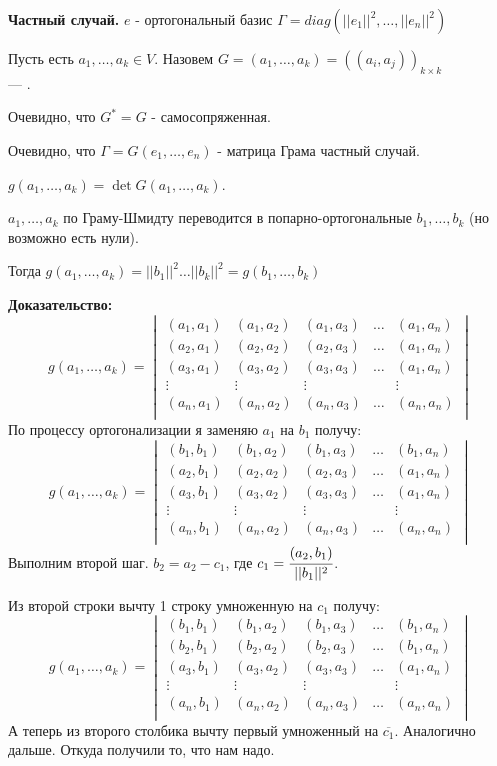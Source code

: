 \textbf{Частный случай.} $e$ - ортогональный базис $\Gamma = diag(||e_1||^2,\ldots,||e_n||^2)$

 Пусть есть $a_1,\ldots, a_k\in V$. Назовем $G = (a_1,\ldots,a_k) =((a_i,a_j))_{k\times k}$ \\--- .

Очевидно, что $G^* = G$ - самосопряженная.

Очевидно, что $\Gamma = G(e_1,\ldots, e_n)$ - матрица Грама частный случай.

 $g(a_1,\ldots, a_k) = \det G(a_1,\ldots, a_k)$.


$a_1,\ldots, a_k$ по Граму-Шмидту переводится в попарно-ортогональные $b_1,\ldots,b_k$ (но возможно есть нули).

Тогда $g(a_1,\ldots, a_k) = ||b_1||^2\ldots ||b_k||^2 = g(b_1,\ldots,b_k)$

\textbf{Доказательство:}
$$g(a_1,\ldots, a_k) = \begin{vmatrix}
    (a_1,a_1) & (a_1, a_2) & (a_1,a_3) & \ldots & (a_1,a_n)\\
     (a_2,a_1) & (a_2, a_2) & (a_2,a_3) & \ldots & (a_1,a_n)\\
      (a_3,a_1) & (a_3, a_2) & (a_3,a_3) & \ldots & (a_1,a_n)\\
      \vdots & \vdots & \vdots & & \vdots \\
       (a_n,a_1) & (a_n, a_2) & (a_n,a_3) & \ldots & (a_n,a_n)\\
\end{vmatrix}$$
По процессу ортогонализации я заменяю $a_1$ на $b_1$ получу:
$$g(a_1,\ldots, a_k) = \begin{vmatrix}
    (b_1,b_1) & (b_1, a_2) & (b_1,a_3) & \ldots & (b_1,a_n)\\
     (a_2,b_1) & (a_2, a_2) & (a_2,a_3) & \ldots & (a_1,a_n)\\
      (a_3,b_1) & (a_3, a_2) & (a_3,a_3) & \ldots & (a_1,a_n)\\
      \vdots & \vdots & \vdots & & \vdots \\
       (a_n,b_1) & (a_n, a_2) & (a_n,a_3) & \ldots & (a_n,a_n)\\
\end{vmatrix}$$
Выполним второй шаг. $b_2 = a_2 -c_1$, где $c_1 = \cfrac{(a_2,b_1)}{||b_1||^2}$.

Из второй строки вычту 1 строку умноженную на $c_1$ получу:
$$g(a_1,\ldots, a_k) = \begin{vmatrix}
    (b_1,b_1) & (b_1, a_2) & (b_1,a_3) & \ldots & (b_1,a_n)\\
     (b_2,b_1) & (b_2, a_2) & (b_2,a_3) & \ldots & (b_1,a_n)\\
      (a_3,b_1) & (a_3, a_2) & (a_3,a_3) & \ldots & (a_1,a_n)\\
      \vdots & \vdots & \vdots & & \vdots \\
       (a_n,b_1) & (a_n, a_2) & (a_n,a_3) & \ldots & (a_n,a_n)\\
\end{vmatrix}$$
А теперь из второго столбика вычту первый умноженный на $\overline{c_1}$. Аналогично дальше. Откуда получили то, что нам надо.

